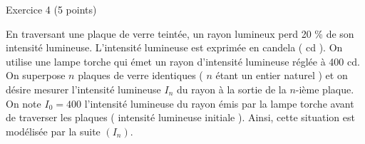 
%
\begin{h2}Exercice 4 (5 points)\end{h2}
En traversant une plaque de verre teintée, un rayon lumineux perd 20  \% de son intensité lumineuse. L'intensité lumineuse est exprimée en candela ( cd ).
\newpar
On utilise une lampe torche qui émet un rayon d'intensité lumineuse réglée à 400 cd.
\newpar
On superpose $n$ plaques de verre identiques (  $n$ étant un entier naturel ) et on désire mesurer l'intensité lumineuse $I_{ n }$ du rayon à la sortie de la $n$-ième plaque.
\newpar
On note $I_{ 0 }=400$ l'intensité lumineuse du rayon émis par la lampe torche avant de traverser les plaques ( intensité lumineuse initiale ). Ainsi, cette situation est modélisée par la suite $( I_{ n } ).$
